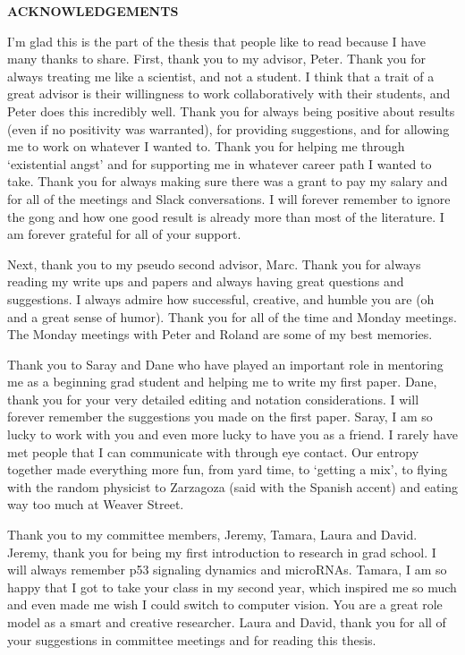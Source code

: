 
\begin{center}
\vspace*{52pt}
{\Large \textbf{ACKNOWLEDGEMENTS}}
\end{center}

I'm glad this is the part of the thesis that people like to read because I have many thanks to share. First, thank you to my advisor, Peter. Thank you for always treating me like a scientist, and not a student. I think that a trait of a great advisor is their willingness to work collaboratively with their students, and Peter does this incredibly well. Thank you for always being positive about results (even if no positivity was warranted), for providing suggestions, and for allowing me to work on whatever I wanted to. Thank you for helping me through `existential angst' and for supporting me in whatever career path I wanted to take. Thank you for always making sure there was a grant to pay my salary and for all of the meetings and Slack conversations. I will forever remember to ignore the gong and how one good result is already more than most of the literature. I am forever grateful for all of your support.

Next, thank you to my pseudo second advisor, Marc. Thank you for always reading my write ups and papers and always having great questions and suggestions. I always admire how successful, creative, and humble you are (oh and a great sense of humor). Thank you for all of the time and Monday meetings. The Monday meetings with Peter and Roland are some of my best memories. 

Thank you to Saray and Dane who have played an important role in mentoring me as a beginning grad student and helping me to write my first paper. Dane, thank you for your very detailed editing and notation considerations. I will forever remember the suggestions you made on the first paper. Saray, I am so lucky to work with you and even more lucky to have you as a friend. I rarely have met people that I can communicate with through eye contact. Our entropy together made everything more fun, from yard time, to `getting a mix', to flying with the random physicist to Zarzagoza (said with the Spanish accent) and eating way too much at Weaver Street. 

Thank you to my committee members, Jeremy, Tamara, Laura and David. Jeremy, thank you for being my first introduction to research in grad school. I will always remember p53 signaling dynamics and microRNAs. Tamara, I am so happy that I got to take your class in my second year, which inspired me so much and even made me wish I could switch to computer vision. You are a great role model as a smart and creative researcher. Laura and David, thank you for all of your suggestions in committee meetings and for reading this thesis.


